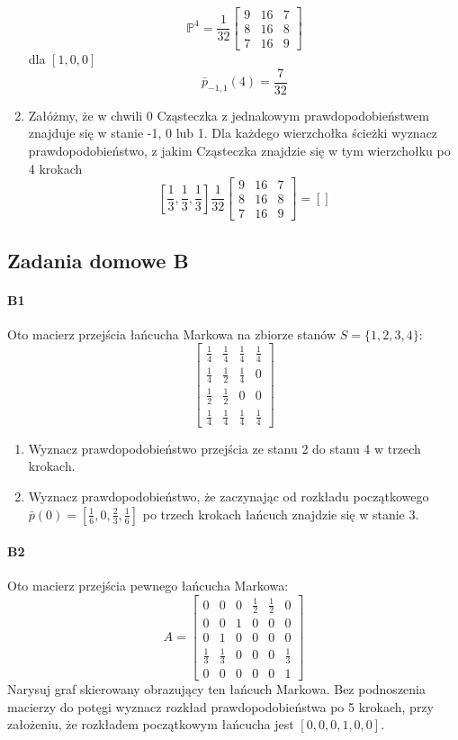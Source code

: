 \documentclass[a4paper,12pt]{article}
\theoremstyle{definition}%
\theoremstyle{definition}
\theoremstyle{problem}
\begin{document}
\begin{enumerate}[label=\alph*)]
$$\mathbb{P}^4=\frac{1}{32}\begin{bmatrix}
9&16&7\\
8&16&8\\
7&16&9
\end{bmatrix}$$
dla $\left[1,0,0\right]$
$$\bar{p}_{-1,1}(4)=\frac{7}{32}$$
\item Załóżmy, że w chwili 0 Cząsteczka z jednakowym prawdopodobieństwem znajduje się w stanie -1, 0 lub 1. Dla każdego wierzchołka ścieżki wyznacz prawdopodobieństwo, z jakim Cząsteczka znajdzie się w tym wierzchołku po 4 krokach
$$\left[\frac{1}{3},\frac{1}{3},\frac{1}{3}\right]\frac{1}{32}\begin{bmatrix}
9&16&7\\
8&16&8\\
7&16&9
\end{bmatrix}=\left[\right]$$
\end{enumerate}


\subsection{Zadania domowe B}
\paragraph{B1} Oto macierz przejścia łańcucha Markowa na zbiorze stanów $S = \{1, 2, 3, 4\}$:
$$\begin{bmatrix}
\frac{1}{4}&\frac{1}{4}&\frac{1}{4}&\frac{1}{4}\\
\frac{1}{4}&\frac{1}{2}&\frac{1}{4}&0\\
\frac{1}{2}&\frac{1}{2}&0&0\\
\frac{1}{4}&\frac{1}{4}&\frac{1}{4}&\frac{1}{4}
\end{bmatrix}$$
\begin{enumerate}[label=\alph*)]
\item Wyznacz prawdopodobieństwo przejścia ze stanu 2 do stanu 4 w trzech krokach.
\item Wyznacz prawdopodobieństwo, że zaczynając od rozkładu początkowego $\bar{p}(0) = \left[ \frac{1}{6}, 0,\frac{2}{3},\frac{1}{6}\right]$ po trzech krokach łańcuch znajdzie się w stanie 3.
\end{enumerate}

\paragraph{B2} Oto macierz przejścia pewnego łańcucha Markowa: 
$$A=\begin{bmatrix}
0&0&0&\frac{1}{2}&\frac{1}{2}&0\\
0&0&1&0&0&0\\
0&1&0&0&0&0\\
\frac{1}{3}&\frac{1}{3}&0&0&0&\frac{1}{3}\\
0&0&0&0&0&1
\end{bmatrix}$$
Narysuj graf skierowany obrazujący ten łańcuch Markowa. Bez podnoszenia macierzy do potęgi wyznacz rozkład prawdopodobieństwa po 5 krokach, przy założeniu, że rozkładem początkowym łańcucha jest $[0, 0, 0, 1, 0, 0]$.
\end{document}
